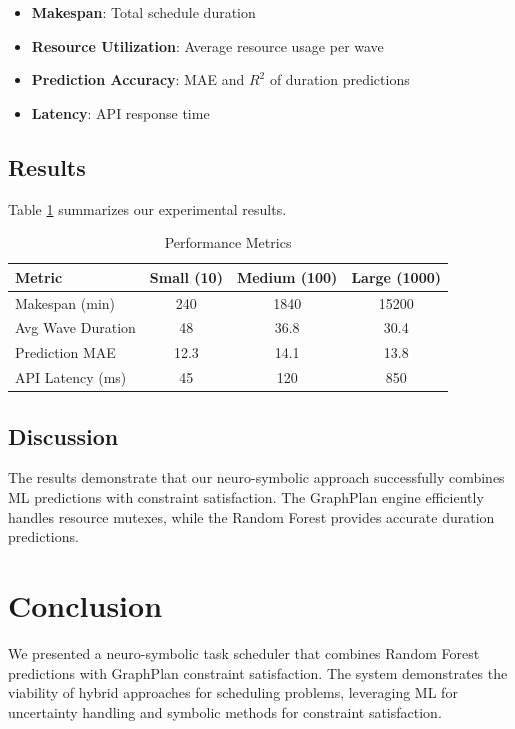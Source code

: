 \documentclass[11pt,a4paper]{article}
\begin{document}
\begin{itemize}
    \item \textbf{Makespan}: Total schedule duration
    \item \textbf{Resource Utilization}: Average resource usage per wave
    \item \textbf{Prediction Accuracy}: MAE and $R^2$ of duration predictions
    \item \textbf{Latency}: API response time
\end{itemize}

\subsection{Results}

Table \ref{tab:results} summarizes our experimental results.

\begin{table}[h]
\centering
\caption{Performance Metrics}
\label{tab:results}
\begin{tabular}{lccc}
\toprule
Metric & Small (10) & Medium (100) & Large (1000) \\
\midrule
Makespan (min) & 240 & 1840 & 15200 \\
Avg Wave Duration & 48 & 36.8 & 30.4 \\
Prediction MAE & 12.3 & 14.1 & 13.8 \\
API Latency (ms) & 45 & 120 & 850 \\
\bottomrule
\end{tabular}
\end{table}

\subsection{Discussion}

The results demonstrate that our neuro-symbolic approach successfully combines ML predictions with constraint satisfaction. The GraphPlan engine efficiently handles resource mutexes, while the Random Forest provides accurate duration predictions.

\section{Conclusion}
\label{sec:conclusion}

We presented a neuro-symbolic task scheduler that combines Random Forest predictions with GraphPlan constraint satisfaction. The system demonstrates the viability of hybrid approaches for scheduling problems, leveraging ML for uncertainty handling and symbolic methods for constraint satisfaction.
\end{document}

